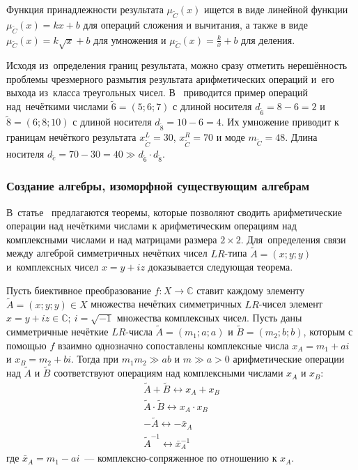 Функция принадлежности результата ${{\mu }_{{\tilde{C}}}}\left( x \right)$ ищется в виде линейной функции ${{\mu }_{{\tilde{C}}}}\left( x \right)=kx+b$ для операций сложения и вычитания, а также в виде ${{\mu }_{{\tilde{C}}}}\left( x \right)=k\sqrt{x}+b$ для умножения и ${{\mu }_{{\tilde{C}}}}\left( x \right)=\frac{k}{x}+b$ для деления.

Исходя из~определения границ результата, можно сразу отметить нерешённость проблемы чрезмерного размытия результата арифметических операций и~его выхода из~класса треугольных чисел. В~\cite{Borisov_Krumberg_Riga} приводится пример операций над~нечёткими числами $\tilde{6}=\left( 5;6;7 \right)$ с длиной носителя ${{d}_{{\tilde{6}}}}=8-6=2$ и $\tilde{8}=\left( 6;8;10 \right)$ с длиной носителя ${{d}_{{\tilde{8}}}}=10-6=4$. Их умножение приводит к границам нечёткого результата $x_{{\tilde{C}}}^{L}=30$, $x_{{\tilde{C}}}^{R}=70$ и моде ${{m}_{{\tilde{C}}}}=48$. Длина носителя ${{d}_{{\tilde{c}}}}=70-30=40\gg {{d}_{{\tilde{6}}}}\cdot {{d}_{{\tilde{8}}}}$.

\subsubsection*{Создание алгебры, изоморфной существующим алгебрам}
В~статье~\cite{Uskov_Complex} предлагаются теоремы, которые позволяют сводить арифметические операции над нечёткими числами к арифметическим операциям над комплексными числами и над матрицами размера $2\times 2$. Для~определения связи между алгеброй симметричных нечётких чисел $LR$-типа $\tilde{A}=\left( x;y;y \right)$ и~комплексных чисел $x=y+iz$ доказывается следующая теорема.

\begin{theorem}
Пусть биективное преобразование $f:X\to \mathbb{C}$ ставит каждому элементу $\tilde{A}=\left( x;y;y \right)\in X$ множества нечётких симметричных $LR$-чисел элемент $x=y+iz\in \mathbb{C};\ i=\sqrt{-1}$ множества комплексных чисел. Пусть даны симметричные нечёткие $LR$-числа $\tilde{A}=\left( {{m}_{1}};a;a \right)$ и $\tilde{B}=\left( {{m}_{2}};b;b \right)$, которым с помощью $f$ взаимно однозначно сопоставлены комплексные числа ${{x}_{A}}={{m}_{1}}+ai$ и ${{x}_{B}}={{m}_{2}}+bi$. Тогда при ${{m}_{1}}{{m}_{2}}\gg ab$ и $m\gg a>0$ арифметические операции над $\tilde A$ и $\tilde B$ соответствуют операциям над комплексными числами ${{x}_{A}}$ и ${{x}_{B}}$:
\begin{gather*}
	\tilde{A}+\tilde{B}\leftrightarrow {{x}_{A}}+{{x}_{B}} \\ 
	\tilde{A}\cdot \tilde{B}\leftrightarrow {{x}_{A}}\cdot {{x}_{B}} \\ 
	-\tilde{A}\leftrightarrow -{{{\bar{x}}}_{A}} \\ 
  	{{{\tilde{A}}}^{-1}}\leftrightarrow \bar{x}_{A}^{-1} 
\end{gather*}
где ${{\bar{x}}_{A}}={{m}_{1}}-ai$~--- комплексно-сопряженное по отношению к $x_A$.
\end{theorem}

